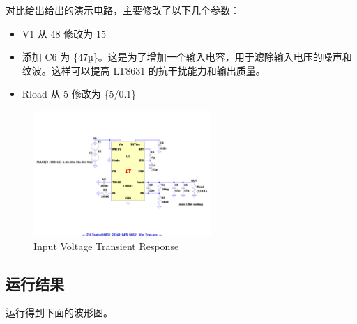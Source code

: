 \documentclass[lang=cn,10pt]{elegantbook}
\begin{document}
对比给出给出的演示电路，主要修改了以下几个参数：

\begin{itemize}
    \item V1 从 48 修改为 15
    \item 添加 C6 为 \{47µ\}。这是为了增加一个输入电容，用于滤除输入电压的噪声和纹波。这样可以提高 LT8631 的抗干扰能力和输出质量。
    \item Rload 从 5 修改为 \{5/0.1\}
\end{itemize}

\begin{figure}[!htb]
    \centering\includegraphics[page=1, width=0.6\textwidth]{figure/5_lt8631_Vin_Tran_asc.pdf}
    \caption{Input Voltage Transient Response}
\end{figure}

\subsection{运行结果}

运行得到下面的波形图。
\end{document}
